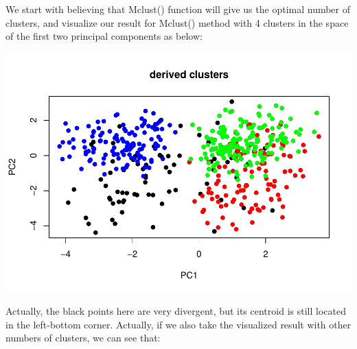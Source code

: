 \documentclass[
  11pt,
]{article}
\newenvironment{Shaded}{\begin{snugshade}}{\end{snugshade}}
\newcommand{\AttributeTok}[1]{\textcolor[rgb]{0.77,0.63,0.00}{#1}}
\newcommand{\CommentTok}[1]{\textcolor[rgb]{0.56,0.35,0.01}{\textit{#1}}}
\newcommand{\DecValTok}[1]{\textcolor[rgb]{0.00,0.00,0.81}{#1}}
\newcommand{\FunctionTok}[1]{\textcolor[rgb]{0.00,0.00,0.00}{#1}}
\newcommand{\NormalTok}[1]{#1}
\newcommand{\SpecialCharTok}[1]{\textcolor[rgb]{0.00,0.00,0.00}{#1}}
\newcommand{\StringTok}[1]{\textcolor[rgb]{0.31,0.60,0.02}{#1}}
\begin{document}
We start with believing that Mclust() function will give us the optimal number of clusters, and visualize our result for Mclust() method with 4 clusters in the space of the first two principal components as below:

\begin{Shaded}
\end{Shaded}

\includegraphics{report_files/figure-latex/Task_3_112-1.pdf}

Actually, the black points here are very divergent, but its centroid is still located in the left-bottom corner. Actually, if we also take the visualized result with other numbers of clusters, we can see that:
\end{document}
